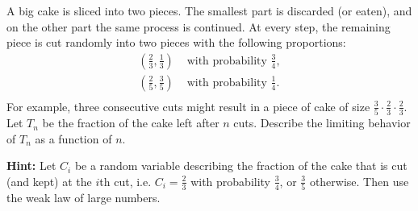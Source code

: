 \documentclass[a4paper,10pt,landscape,twocolumn]{scrartcl}
\begin{document}
\begin{exercise}
A big cake is sliced into two pieces. The smallest part is discarded (or eaten), and on the other part the same process is continued. At every step, the remaining piece is cut randomly into two pieces with the following proportions:
\begin{align*}
\left(\frac{2}{3},\frac{1}{3}\right) &\mbox{ with probability } \frac{3}{4},\\
\left(\frac{2}{5},\frac{3}{5}\right) &\mbox{ with probability } \frac{1}{4}.\\
\end{align*}
For example, three consecutive cuts might result in a piece of cake of size $\frac{3}{5} \cdot \frac{2}{3} \cdot \frac{2}{3}$. Let $T_n$ be the fraction of the cake left after $n$ cuts. Describe the limiting behavior of $T_n$ as a function of $n$.


\textbf{Hint:} Let $C_i$ be a random variable describing the fraction of the cake that is cut (and kept) at the $i$th cut, i.e. $C_i = \frac{2}{3}$ with probability $\frac{3}{4}$, or $\frac{3}{5}$ otherwise.  Then use the weak law of large numbers.





\end{exercise}
\end{document}
